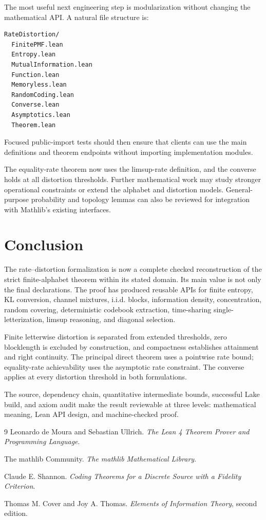 \documentclass[11pt]{article}
\begin{document}
The most useful next engineering step is modularization without changing the
mathematical API.  A natural file structure is:
\begin{verbatim}
RateDistortion/
  FinitePMF.lean
  Entropy.lean
  MutualInformation.lean
  Function.lean
  Memoryless.lean
  RandomCoding.lean
  Converse.lean
  Asymptotics.lean
  Theorem.lean
\end{verbatim}
Focused public-import tests should then ensure that clients can use the main
definitions and theorem endpoints without importing implementation modules.

The equality-rate theorem now uses the limsup-rate definition, and the
converse holds at all distortion thresholds. Further mathematical work may
study stronger operational constraints or extend the alphabet and distortion
models. General-purpose probability and topology lemmas can also be reviewed
for integration with Mathlib's existing interfaces.

\section{Conclusion}

The rate--distortion formalization is now a complete checked reconstruction of
the strict finite-alphabet theorem within its stated domain.  Its main value is
not only the final declarations.  The proof has produced reusable APIs for
finite entropy, KL conversion, channel mixtures, i.i.d. blocks, information
density, concentration, random covering, deterministic codebook extraction,
time-sharing single-letterization, limsup reasoning, and diagonal selection.

Finite letterwise distortion is separated from extended thresholds, zero
blocklength is excluded by construction, and compactness establishes
attainment and right continuity. The principal direct theorem uses a pointwise
rate bound; equality-rate achievability uses the asymptotic rate constraint.
The converse applies at every distortion threshold in both formulations.

The source, dependency chain, quantitative intermediate bounds, successful
Lake build, and axiom audit make the result reviewable at three levels:
mathematical meaning, Lean API design, and machine-checked proof.

\begin{thebibliography}{9}
Leonardo de Moura and Sebastian Ullrich.
\emph{The Lean 4 Theorem Prover and Programming Language}.

The mathlib Community.
\emph{The mathlib Mathematical Library}.

Claude E. Shannon.
\emph{Coding Theorems for a Discrete Source with a Fidelity Criterion}.

Thomas M. Cover and Joy A. Thomas.
\emph{Elements of Information Theory}, second edition.
\end{thebibliography}
\end{document}
